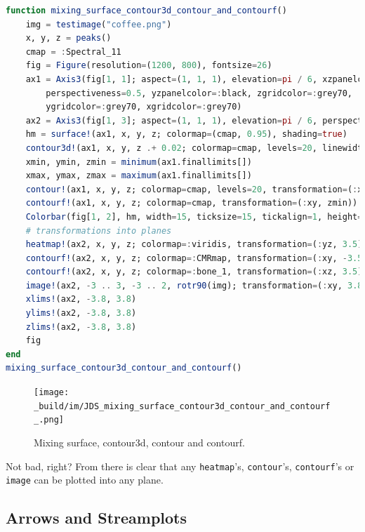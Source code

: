 \documentclass[
  notoc %
]{tufte-book}
\newcommand{\passthrough}[1]{#1}
\begin{document}
\begin{lstlisting}[language=Julia]
function mixing_surface_contour3d_contour_and_contourf()
    img = testimage("coffee.png")
    x, y, z = peaks()
    cmap = :Spectral_11
    fig = Figure(resolution=(1200, 800), fontsize=26)
    ax1 = Axis3(fig[1, 1]; aspect=(1, 1, 1), elevation=pi / 6, xzpanelcolor=(:black, 0.75),
        perspectiveness=0.5, yzpanelcolor=:black, zgridcolor=:grey70,
        ygridcolor=:grey70, xgridcolor=:grey70)
    ax2 = Axis3(fig[1, 3]; aspect=(1, 1, 1), elevation=pi / 6, perspectiveness=0.5)
    hm = surface!(ax1, x, y, z; colormap=(cmap, 0.95), shading=true)
    contour3d!(ax1, x, y, z .+ 0.02; colormap=cmap, levels=20, linewidth=2)
    xmin, ymin, zmin = minimum(ax1.finallimits[])
    xmax, ymax, zmax = maximum(ax1.finallimits[])
    contour!(ax1, x, y, z; colormap=cmap, levels=20, transformation=(:xy, zmax))
    contourf!(ax1, x, y, z; colormap=cmap, transformation=(:xy, zmin))
    Colorbar(fig[1, 2], hm, width=15, ticksize=15, tickalign=1, height=Relative(0.35))
    # transformations into planes
    heatmap!(ax2, x, y, z; colormap=:viridis, transformation=(:yz, 3.5))
    contourf!(ax2, x, y, z; colormap=:CMRmap, transformation=(:xy, -3.5))
    contourf!(ax2, x, y, z; colormap=:bone_1, transformation=(:xz, 3.5))
    image!(ax2, -3 .. 3, -3 .. 2, rotr90(img); transformation=(:xy, 3.8))
    xlims!(ax2, -3.8, 3.8)
    ylims!(ax2, -3.8, 3.8)
    zlims!(ax2, -3.8, 3.8)
    fig
end
mixing_surface_contour3d_contour_and_contourf()
\end{lstlisting}

\begin{figure}
\hypertarget{fig:mixing_surface_contour3d_contour_and_contourf}{%
\centering
\texttt{[image: \_build/im/JDS\_mixing\_surface\_contour3d\_contour\_and\_contourf\_.png]}
\caption{Mixing surface, contour3d, contour and
contourf.}\label{fig:mixing_surface_contour3d_contour_and_contourf}
}
\end{figure}

Not bad, right? From there is clear that any
\passthrough{\lstinline!heatmap!}'s,
\passthrough{\lstinline!contour!}'s,
\passthrough{\lstinline!contourf!}'s or \passthrough{\lstinline!image!}
can be plotted into any plane.

\hypertarget{arrows-and-streamplots}{%
\subsection{Arrows and Streamplots}\label{arrows-and-streamplots}}
\end{document}
